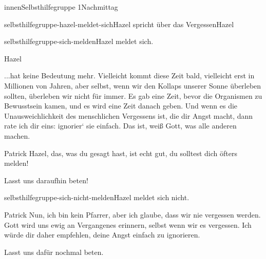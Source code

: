 \documentclass[12pt]{article}
\begin{document}
\begin{scene}[cut to]{innen}{Selbsthilfegruppe 1}{Nachmittag}
\begin{decision}{selbsthilfegruppe-hazel-meldet-sich}{\gls{Hazel} spricht über das Vergessen}{\gls{Hazel}}
\begin{option}{selbsthilfegruppe-sich-melden}{\gls{Hazel} meldet sich.}
\begin{dialog}{Hazel}

                    ...hat keine Bedeutung mehr.
                    Vielleicht kommt diese Zeit bald, vielleicht erst in Millionen von Jahren, aber selbst, wenn wir den Kollaps unserer Sonne überleben sollten, überleben wir nicht für immer.
                    Es gab eine Zeit, bevor die Organismen zu Bewusstsein kamen, und es wird eine Zeit danach geben.
                    Und wenn es die Unausweichlichkeit des menschlichen Vergessens ist, die dir Angst macht, dann rate ich dir eins: ignorier‘ sie einfach.
                    Das ist, weiß Gott, was alle anderen machen.
                \end{dialog}


                \begin{dialog}{Patrick}
                    Hazel, das, was du gesagt hast, ist echt gut, du solltest dich öfters melden!

                    Lasst uns daraufhin beten!
                \end{dialog}
            \end{option}
            \begin{option}{selbsthilfegruppe-sich-nicht-melden}{\gls{Hazel} meldet sich nicht.}

                \begin{dialog}{Patrick}
                    Nun, ich bin kein Pfarrer, aber ich glaube, dass wir nie vergessen werden.
                    Gott wird uns ewig an Vergangenes erinnern, selbst wenn wir es vergessen.
                    Ich würde dir daher empfehlen, deine Angst einfach zu ignorieren.

                    Lasst uns dafür nochmal beten.
                \end{dialog}
            \end{option}
        \end{decision}


\end{scene}
\end{document}
